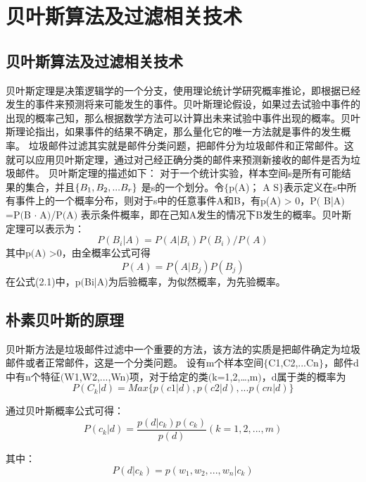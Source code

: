 \chapter{贝叶斯算法及过滤相关技术}

\section{贝叶斯算法及过滤相关技术}
贝叶斯定理是决策逻辑学的一个分支，使用理论统计学研究概率推论，即根据已经发生的事件来预测将来可能发生的事件。贝叶斯理论假设，如果过去试验中事件的出现的概率己知，那么根据数学方法可以计算出未来试验中事件出现的概率。贝叶斯理论指出，如果事件的结果不确定，那么量化它的唯一方法就是事件的发生概率。
 垃圾邮件过滤其实就是邮件分类问题，把邮件分为垃圾邮件和正常邮件。这就可以应用贝叶斯定理，通过对己经正确分类的邮件来预测新接收的邮件是否为垃圾邮件。
贝叶斯定理的描述如下：
 对于一个统计实验，样本空间s是所有可能结果的集合，并且\begin{math} 
 $\{$B_1,B_2,...B_r$\}$
 \end{math}
是s的一个划分。令$\{$p(A)； A S$\}$表示定义在s中所有事件上的一个概率分布，则对于s中的任意事件A和B，有p(A) > 0，P$($ B|A$)$ =P$($B \(\cdot\;\)A$)$/P$($A$)$ 表示条件概率，即在己知A发生的情况下B发生的概率。贝叶斯定理可以表示为：
\begin{equation}
 P(B_i|A) = P(A|B_i)P(B_i)/P(A)  
\end{equation}
其中p$($A$)$ >0，由全概率公式可得
\begin{equation}
 P(A) = P(A|B_j)P(B_j)  
\end{equation}
在公式(2.1)中，p$($Bi|A$)$为后验概率，为似然概率，为先验概率。
\section{朴素贝叶斯的原理}
贝叶斯方法是垃圾邮件过滤中一个重要的方法，该方法的实质是把邮件确定为垃圾邮件或者正常邮件，这是一个分类问题。
设有m个样本空间$\{$C1,C2,...Cn$\}$，邮件d中有n个特征$($W1,W2,...,Wn$)$项，对于给定的类$($k=1,2,…,m$)$，d属于类的概率为
\begin{equation}
 P(C_k|d) = Max\{p(c1|d),p(c2|d),...p(cn|d)\} 
\end{equation}

通过贝叶斯概率公式可得：
\begin{equation}
 P(c_k|d) = \frac{p(d|c_k)p(c_k)}{p(d)}   (k=1,2,...,m)
\end{equation}

其中：
\begin{equation}
 P(d|c_k) = p(w_1,w_2,...,w_n|c_k)
\end{equation}

